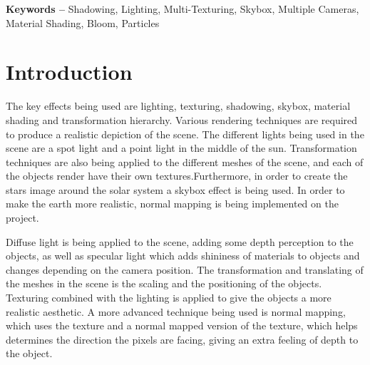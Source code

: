 \documentclass[10pt, a4paper]{article}
\title{\mytitle}
\author{\myauthor\hspace{1em}\\\contact\\Edinburgh Napier University\hspace{0.5em}-\hspace{0.5em}\mymodule}
\date{}
\newcommand{\figuremacro}[5]{
    \begin{figure}[#1]
        \centering
        \texttt{[image: \#2]}
        \caption[#3]{\textbf{#3}#4}
        \label{fig:#2}
    \end{figure}
}
\begin{document}
	
		\hyphenchar{}    
	
	\maketitle
	\begin{abstract}
	The aim of this project was to render a realistic scene using the skills developed in the Computer Graphics Module at Edinburgh Napier University using OpenGL and C++. The scene produced in this project is a solar system, inspired by my adoration for the stars and the Star Wars movies \cite{StarWars}. I was also inspired by some of the previous Computer Graphics Projects \cite{PreviousProjects}. Additionally, I gained inspiration from a Youtube tutorial\cite{Tutorial} for the bloom effect. Advanced 3D effects and techniques are used to accomplish the generated result, such as lighting,shadowing and texturing. These techniques are widely used in a variety of games.
	\figuremacro{h}{MillenniumFalcon}{Millenium Falcon}{ - Chase Camera Inspiration}{1.0}
	\end{abstract}
    
	\textbf{Keywords -- }{Shadowing, Lighting, Multi-Texturing, Skybox, Multiple Cameras, Material Shading, Bloom, Particles}
	\section{Introduction}

    The key effects being used are lighting, texturing, shadowing, skybox, material shading and transformation hierarchy. Various rendering techniques are required to produce a realistic depiction of the scene. The different lights being used in the scene are a spot light and a point light in the middle of the sun. Transformation techniques are also being applied to the different meshes of the scene, and each of the objects render have their own textures.Furthermore, in order to create the stars image around the solar system a skybox effect is being used. In order to make the earth more realistic, normal mapping is being implemented on the project.
    
    Diffuse light is being applied to the scene, adding some depth perception to the objects, as well as specular light which adds shininess of materials to objects and changes depending on the camera position. The transformation and translating of the meshes in the scene is the scaling and the positioning of the objects. Texturing combined with the lighting is applied to give the objects a more realistic aesthetic.  A more advanced technique being used is normal mapping, which uses the texture and a normal mapped version of the texture, which helps determines the direction the pixels are facing, giving an extra feeling of depth to the object.
    
\end{document}
